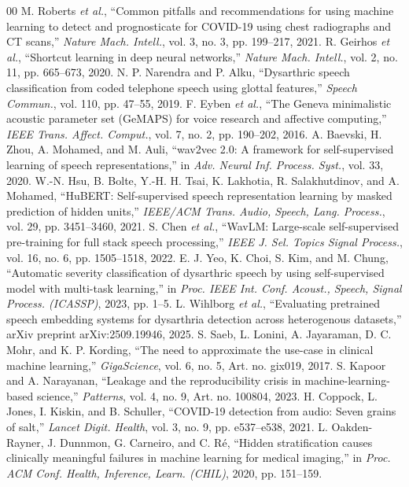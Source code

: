 \documentclass[conference]{IEEEtran}
\begin{document}
\begin{thebibliography}{00}
 M. Roberts \emph{et al.}, ``Common pitfalls and recommendations for using machine learning to detect and prognosticate for COVID-19 using chest radiographs and CT scans,'' \emph{Nature Mach. Intell.}, vol. 3, no. 3, pp. 199--217, 2021.
 R. Geirhos \emph{et al.}, ``Shortcut learning in deep neural networks,'' \emph{Nature Mach. Intell.}, vol. 2, no. 11, pp. 665--673, 2020.
 N. P. Narendra and P. Alku, ``Dysarthric speech classification from coded telephone speech using glottal features,'' \emph{Speech Commun.}, vol. 110, pp. 47--55, 2019.
 F. Eyben \emph{et al.}, ``The Geneva minimalistic acoustic parameter set (GeMAPS) for voice research and affective computing,'' \emph{IEEE Trans. Affect. Comput.}, vol. 7, no. 2, pp. 190--202, 2016.
 A. Baevski, H. Zhou, A. Mohamed, and M. Auli, ``wav2vec 2.0: A framework for self-supervised learning of speech representations,'' in \emph{Adv. Neural Inf. Process. Syst.}, vol. 33, 2020.
 W.-N. Hsu, B. Bolte, Y.-H. H. Tsai, K. Lakhotia, R. Salakhutdinov, and A. Mohamed, ``HuBERT: Self-supervised speech representation learning by masked prediction of hidden units,'' \emph{IEEE/ACM Trans. Audio, Speech, Lang. Process.}, vol. 29, pp. 3451--3460, 2021.
 S. Chen \emph{et al.}, ``WavLM: Large-scale self-supervised pre-training for full stack speech processing,'' \emph{IEEE J. Sel. Topics Signal Process.}, vol. 16, no. 6, pp. 1505--1518, 2022.
 E. J. Yeo, K. Choi, S. Kim, and M. Chung, ``Automatic severity classification of dysarthric speech by using self-supervised model with multi-task learning,'' in \emph{Proc. IEEE Int. Conf. Acoust., Speech, Signal Process. (ICASSP)}, 2023, pp. 1--5.
 L. Wihlborg \emph{et al.}, ``Evaluating pretrained speech embedding systems for dysarthria detection across heterogenous datasets,'' arXiv preprint arXiv:2509.19946, 2025.
 S. Saeb, L. Lonini, A. Jayaraman, D. C. Mohr, and K. P. Kording, ``The need to approximate the use-case in clinical machine learning,'' \emph{GigaScience}, vol. 6, no. 5, Art. no. gix019, 2017.
 S. Kapoor and A. Narayanan, ``Leakage and the reproducibility crisis in machine-learning-based science,'' \emph{Patterns}, vol. 4, no. 9, Art. no. 100804, 2023.
 H. Coppock, L. Jones, I. Kiskin, and B. Schuller, ``COVID-19 detection from audio: Seven grains of salt,'' \emph{Lancet Digit. Health}, vol. 3, no. 9, pp. e537--e538, 2021.
 L. Oakden-Rayner, J. Dunnmon, G. Carneiro, and C. R\'e, ``Hidden stratification causes clinically meaningful failures in machine learning for medical imaging,'' in \emph{Proc. ACM Conf. Health, Inference, Learn. (CHIL)}, 2020, pp. 151--159.

\end{thebibliography}
\end{document}
